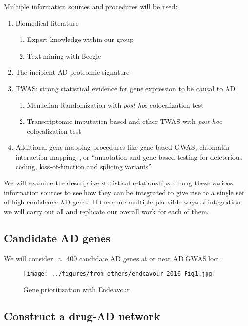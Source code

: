 \documentclass[letterpaper]{article}
\begin{document}
Multiple information sources and procedures will be used:

\begin{enumerate}
\item Biomedical literature
\begin{enumerate}
	\item Expert knowledge within our group
	\item Text mining with Beegle~\citep{ElShal2016}
\end{enumerate}
\item The incipient AD proteomic signature~\citep{JacksonA.Roberts2021}
\item TWAS: strong statistical evidence for gene expression to be causal to AD
\begin{enumerate}
	\item Mendelian Randomization with \emph{post-hoc} colocalization test~\citep{Baird2021,Kunkle2019}
	\item Transcriptomic imputation based and other TWAS with \emph{post-hoc}
		colocalization test~\citep{Gerring2020,Jansen2019}
\end{enumerate}
\item Additional gene mapping procedures like gene based GWAS, chromatin
	interaction mapping~\citep{Jansen2019}, or ``annotation and gene-based testing for deleterious
	coding, loss-of-function and splicing variants''~\citep{Kunkle2019}
\end{enumerate}

We will examine the descriptive statistical relationships among these various information
sources to see how they can be integrated to give rise to a single set of high
confidence AD genes.  If there are multiple plausible ways of integration we
will carry out all and replicate our overall work for each of them.

\subsection{Candidate AD genes}
\label{sec:AD-candidate}

We will consider $\approx$ 400 candidate AD genes at or near AD GWAS loci.

\begin{figure}
\texttt{[image: ../figures/from-others/endeavour-2016-Fig1.jpg]}
\caption{Gene prioritization with Endeavour \citep{Tranchevent2016}}
\label{fig:endeavour}
\end{figure}

\subsection{Construct a drug-AD network}
\end{document}
